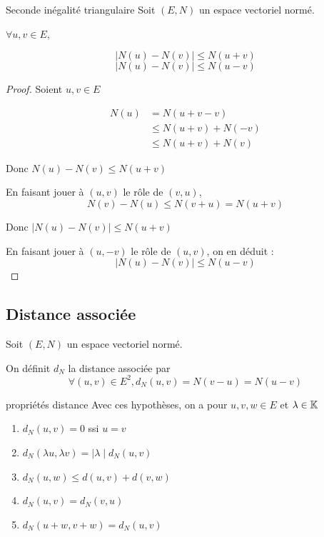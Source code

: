 \begin{proposition}{Seconde inégalité triangulaire}{}
    Soit $(E, N)$ un espace vectoriel normé. 

    $\forall u, v \in E, $

    $$\mid N(u) - N(v) \mid \leqslant N(u + v)$$
    $$\mid N(u) - N(v) \mid \leqslant N(u - v)$$
\end{proposition}


\begin{proof}

    Soient $u, v \in E$

    \begin{align*}
    N(u) &= N(u + v - v) \\
         &\leqslant N(u + v) + N(-v) \\
         &\leqslant N(u + v) + N(v)
    \end{align*}

    Donc $N(u) - N(v) \leqslant N(u + v)$

    En faisant jouer à $(u, v)$ le rôle de $(v, u)$, 
    $$ N(v) - N(u) \leqslant N(v + u) = N(u + v)$$

    Donc $\mid N(u) - N(v) \mid \leqslant N(u + v)$

    En faisant jouer à $(u, -v)$ le rôle de $(u, v)$, on en déduit : 
    $$\mid N(u) - N(v) \mid \leqslant N(u - v)$$
\end{proof}


\subsection{Distance associée}

\begin{definition}{}{}
    Soit $(E, N)$ un espace vectoriel normé. 

    On définit $d_N$ la distance associée par 
    $$\forall (u, v) \in E^2, d_N(u, v) = N(v - u) = N(u - v)$$
\end{definition}

\begin{proposition}{propriétés distance}{}
    Avec ces hypothèses, on a pour $u, v, w \in E$ et $\lambda \in \mathbb{K}$

    \begin{enumerate}
        \item $d_N(u, v) = 0$ ssi $u = v$
        \item $d_N(\lambda u, \lambda v) = \mid \lambda \mid d_N(u, v)$
        \item $d_N(u, w) \leqslant d(u, v) + d(v, w)$
        \item $d_N (u, v) = d_N (v, u)$
        \item $d_N (u + w, v + w) = d_N (u, v)$
    \end{enumerate}
\end{proposition}

